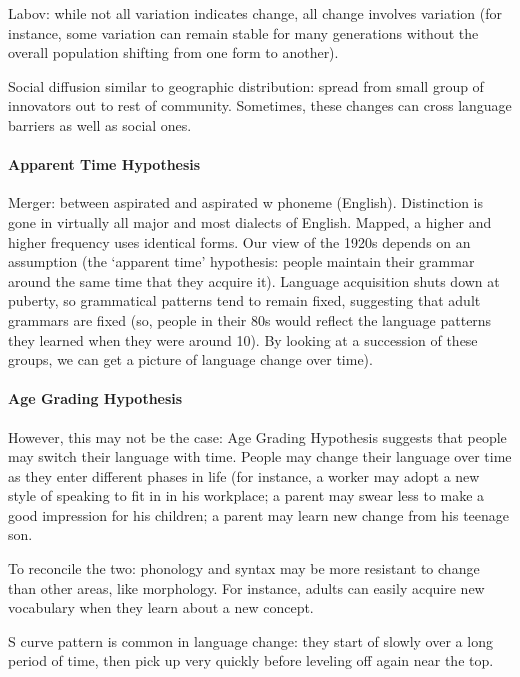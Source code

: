 \documentclass{exam}
\begin{document}
Labov: while not all variation indicates change, all change involves variation (for instance, some variation can remain stable for many generations without the overall population shifting from one form to another). 

Social diffusion similar to geographic distribution: spread from small group of innovators out to rest of community. Sometimes, these changes can cross language barriers as well as social ones.

\paragraph{Apparent Time Hypothesis} Merger: between aspirated and aspirated w phoneme (English). Distinction is gone in virtually all major and most dialects of English. Mapped, a higher and higher frequency uses identical forms. Our view of the 1920s depends on an assumption (the `apparent time' hypothesis: people maintain their grammar around the same time that they acquire it). Language acquisition shuts down at puberty, so grammatical patterns tend to remain fixed, suggesting that adult grammars are fixed (so, people in their 80s would reflect the language patterns they learned when they were around 10). By looking at a succession of these groups, we can get a picture of language change over time). 

\paragraph{Age Grading Hypothesis} However, this may not be the case: Age Grading Hypothesis suggests that people may switch their language with time. People may change their language over time as they enter different phases in life (for instance, a worker may adopt a new style of speaking to fit in in his workplace; a parent may swear less to make a good impression for his children; a parent may learn new change from his teenage son.

To reconcile the two: phonology and syntax may be more resistant to change than other areas, like morphology. For instance, adults can easily acquire new vocabulary when they learn about a new concept. 

S curve pattern is common in language change: they start of slowly over a long period of time, then pick up very quickly before leveling off again near the top. 
\end{document}

